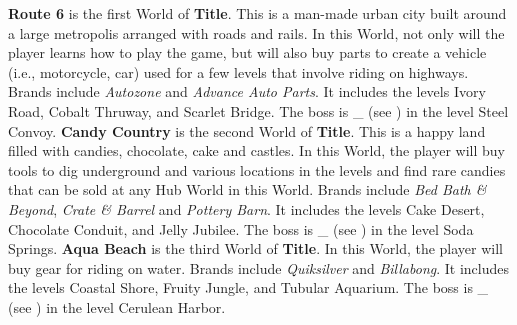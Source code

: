 \documentclass[11pt]{article}
\begin{document}
	\textbf{Route 6} is the first World of \textbf{Title}. This is a man-made urban city built around a large metropolis arranged with roads and rails. In this World, not only will the player learns how to play the game, but will also buy parts to create a vehicle (i.e., motorcycle, car) used for a few levels that involve riding on highways. Brands include \textit{Autozone} and \textit{Advance Auto Parts}. It includes the levels Ivory Road, Cobalt Thruway, and Scarlet Bridge. The boss is \_ (see ) in the level Steel Convoy. \newline \newline
	\textbf{Candy Country} is the second World of \textbf{Title}. This is a happy land filled with candies, chocolate, cake and castles. In this World, the player will buy tools to dig underground and various locations in the levels and find rare candies that can be sold at any Hub World in this World. Brands include \textit{Bed Bath \& Beyond}, \textit{Crate \& Barrel} and \textit{Pottery Barn}. It includes the levels Cake Desert, Chocolate Conduit, and Jelly Jubilee. The boss is \_ (see ) in the level Soda Springs. \newline \newline
	\textbf{Aqua Beach} is the third World of \textbf{Title}. \iffalse This is an island-themed World that features \_. \fi In this World, the player will buy gear for riding on water. Brands include \textit{Quiksilver} and \textit{Billabong}. It includes the levels Coastal Shore, Fruity Jungle, and Tubular Aquarium. The boss is \_ (see ) in the level Cerulean Harbor. \newline \newline
\end{document}
